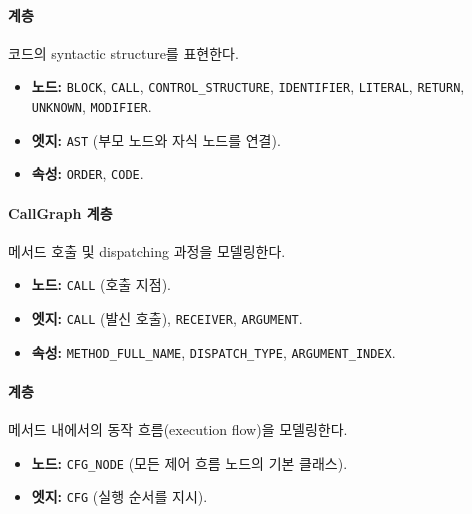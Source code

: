 \paragraph{\abbrAST 계층} 코드의 syntactic structure를 표현한다.
\begin{itemize} \setlength{\itemsep}{0pt} \setlength{\parskip}{0pt} \setlength{\topsep}{0pt} \setlength{\partopsep}{0pt}
    \item \textbf{노드:} \texttt{BLOCK}, \texttt{CALL}, \texttt{CONTROL\_STRUCTURE}, \texttt{IDENTIFIER}, \texttt{LITERAL}, \texttt{RETURN}, \texttt{UNKNOWN}, \texttt{MODIFIER}.
    \item \textbf{엣지:} \texttt{AST} (부모 노드와 자식 노드를 연결).
    \item \textbf{속성:} \texttt{ORDER}, \texttt{CODE}.
\end{itemize}

\paragraph{CallGraph 계층} 메서드 호출 및 dispatching 과정을 모델링한다.
\begin{itemize} \setlength{\itemsep}{0pt} \setlength{\parskip}{0pt} \setlength{\topsep}{0pt} \setlength{\partopsep}{0pt}
    \item \textbf{노드:} \texttt{CALL} (호출 지점).
    \item \textbf{엣지:} \texttt{CALL} (발신 호출), \texttt{RECEIVER}, \texttt{ARGUMENT}.
    \item \textbf{속성:} \texttt{METHOD\_FULL\_NAME}, \texttt{DISPATCH\_TYPE}, \texttt{ARGUMENT\_INDEX}.
\end{itemize}

\paragraph{\abbrCFG 계층} 메서드 내에서의 동작 흐름(execution flow)을 모델링한다.
\begin{itemize} \setlength{\itemsep}{0pt} \setlength{\parskip}{0pt} \setlength{\topsep}{0pt} \setlength{\partopsep}{0pt}
    \item \textbf{노드:} \texttt{CFG\_NODE} (모든 제어 흐름 노드의 기본 클래스).
    \item \textbf{엣지:} \texttt{CFG} (실행 순서를 지시).
\end{itemize}

